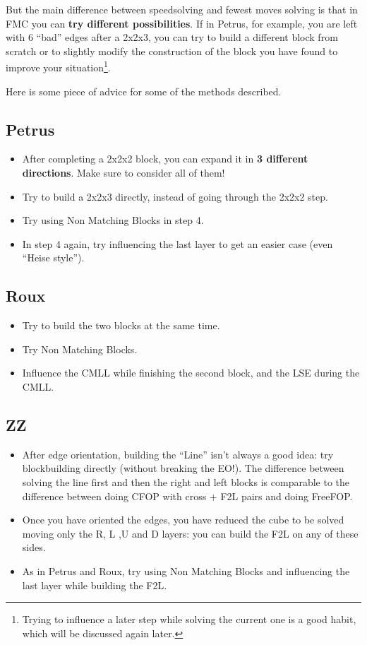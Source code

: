 \documentclass[11pt,a4paper]{book}
\begin{document}
But the main difference between speedsolving and fewest moves solving is that in FMC you can \textbf{try different possibilities}. If in Petrus, for example, you are left with 6 ``bad'' edges after a 2x2x3, you can try to build a different block from scratch or to slightly modify the construction of the block you have found to improve your situation\footnote{Trying to influence a later step while solving the current one is a good habit, which will be discussed again later.}.

Here is some piece of advice for some of the methods described.

\subsection{Petrus}
\begin{itemize}
\item After completing a 2x2x2 block, you can expand it in \textbf{3 different directions}. Make sure to consider all of them!
\item Try to build a 2x2x3 directly, instead of going through the 2x2x2 step.
\item Try using Non Matching Blocks in step 4.
\item In step 4 again, try influencing the last layer to get an easier case (even ``Heise style'').
\end{itemize}

\subsection{Roux}
\begin{itemize}
\item Try to build the two blocks at the same time.
\item Try Non Matching Blocks.
\item Influence the CMLL while finishing the second block, and the LSE during the CMLL.
\end{itemize}

\subsection{ZZ}
\begin{itemize}
\item After edge orientation, building the ``Line'' isn't always a good idea: try blockbuilding directly (without breaking the EO!). The difference between solving the line first and then the right and left blocks is comparable to the difference between doing CFOP with cross + F2L pairs and doing FreeFOP.
\item Once you have oriented the edges, you have reduced the cube to be solved moving only the R, L ,U and D layers: you can build the F2L on any of these sides.
\item As in Petrus and Roux, try using Non Matching Blocks and influencing the last layer while building the F2L.
\end{itemize}
\end{document}
